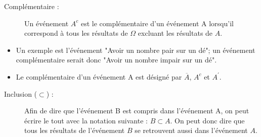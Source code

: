 \documentclass[10pt, french]{article}
\def\firstrectangle{(0,0) rectangle (7, 4)}
\def\firstcircle{(2.5,2) circle (1.5cm)}
\def\secondcircle{(4.5, 2) circle (1.5cm)}
\begin{document}
\begin{multicols*}{2}
\begin{center}
\end{center}
\begin{description} 
 \item[Complémentaire :] Un événement $A^{c}$ est le complémentaire d'un événement A lorsqu'il correspond à tous les résultats de $\Omega$ excluant les résultats de $A$. 
\end{description}
\begin{itemize}
  	\item	Un exemple est l'événement "Avoir un nombre pair sur un dé"; un événement complémentaire serait donc "Avoir un nombre impair sur un dé".
  	\item   Le complémentaire d'un événement A est désigné par {$\overline{A}$}, $A^{c}$ et $A^{'}$.
\end{itemize}
\begin{center}
\end{center}
\pagebreak
\begin{description} 
 \item[Inclusion ($\subset$) :] Afin de dire que l'événement B est compris dans l'événement A, on peut écrire le tout avec la notation suivante : $B \subset A$. On peut donc dire que tous les résultats de l'événement $B$ se retrouvent aussi dans l'événement $A$.
\end{description}
\begin{center}
\end{center}


\end{multicols*}
\end{document}
